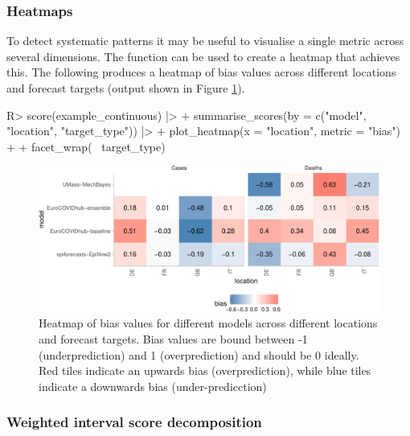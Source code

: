 \documentclass[
]{jss}
\begin{document}
\subsubsection{Heatmaps}\label{heatmaps}

To detect systematic patterns it may be useful to visualise a single
metric across several dimensions. The function 
can be used to create a heatmap that achieves this. The following
produces a heatmap of bias values across different locations and
forecast targets (output shown in Figure \ref{fig:score-heatmap}).

\begin{CodeChunk}
\begin{CodeInput}
R> score(example_continuous) |>
+   summarise_scores(by = c("model", "location", "target_type")) |>
+   plot_heatmap(x = "location", metric = "bias") + 
+     facet_wrap(~ target_type) 
\end{CodeInput}
\begin{figure}[!h]

{\centering \includegraphics[width=1\linewidth]{manuscript_files/figure-latex/score-heatmap-1} 

}

\caption[Heatmap of bias values for different models across different locations and forecast targets]{Heatmap of bias values for different models across different locations and forecast targets. Bias values are bound between -1 (underprediction) and 1 (overprediction) and should be 0 ideally. Red tiles indicate an upwards bias (overprediction), while blue tiles indicate a downwards bias (under-predicction)}\label{fig:score-heatmap}
\end{figure}
\end{CodeChunk}

\subsubsection{Weighted interval score
decomposition}\label{weighted-interval-score-decomposition}
\end{document}
